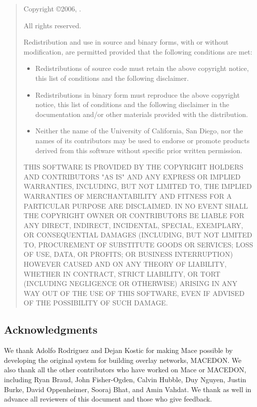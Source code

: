 
\bigskip
\begin{quote}
Copyright \copyright 2006, \authorlist.

All rights reserved.

Redistribution and use in source and binary forms, with or without
modification, are permitted provided that the following conditions are met:

\begin{itemize}
\item Redistributions of source code must retain the above copyright notice, this
  list of conditions and the following disclaimer.
\item Redistributions in binary form must reproduce the above copyright notice,
this list of conditions and the following disclaimer in the documentation
and/or other materials provided with the distribution.
\item Neither the name of the University of California, San Diego, nor the
names of its contributors may be used to endorse or promote products derived
from this software without specific prior written permission.
\end{itemize}

THIS SOFTWARE IS PROVIDED BY THE COPYRIGHT HOLDERS AND CONTRIBUTORS "AS IS" AND
ANY EXPRESS OR IMPLIED WARRANTIES, INCLUDING, BUT NOT LIMITED TO, THE IMPLIED
WARRANTIES OF MERCHANTABILITY AND FITNESS FOR A PARTICULAR PURPOSE ARE
DISCLAIMED. IN NO EVENT SHALL THE COPYRIGHT OWNER OR CONTRIBUTORS BE LIABLE FOR
ANY DIRECT, INDIRECT, INCIDENTAL, SPECIAL, EXEMPLARY, OR CONSEQUENTIAL DAMAGES
(INCLUDING, BUT NOT LIMITED TO, PROCUREMENT OF SUBSTITUTE GOODS OR SERVICES;
LOSS OF USE, DATA, OR PROFITS; OR BUSINESS INTERRUPTION) HOWEVER CAUSED AND ON
ANY THEORY OF LIABILITY, WHETHER IN CONTRACT, STRICT LIABILITY, OR TORT
(INCLUDING NEGLIGENCE OR OTHERWISE) ARISING IN ANY WAY OUT OF THE USE OF THIS
SOFTWARE, EVEN IF ADVISED OF THE POSSIBILITY OF SUCH DAMAGE.
\end{quote}

\subsection{Acknowledgments}
\label{sec:acknowledgements}

We thank Adolfo Rodriguez and Dejan Kostic for making Mace possible by
developing the original system for building overlay networks, MACEDON.  We also
thank all the other contributors who have worked on Mace or MACEDON, including
Ryan Braud, John Fisher-Ogden, Calvin Hubble, Duy Nguyen, Justin Burke, David
Oppenheimer, Sooraj Bhat, and Amin Vahdat.  We thank as well in advance all
reviewers of this document and those who give feedback.

